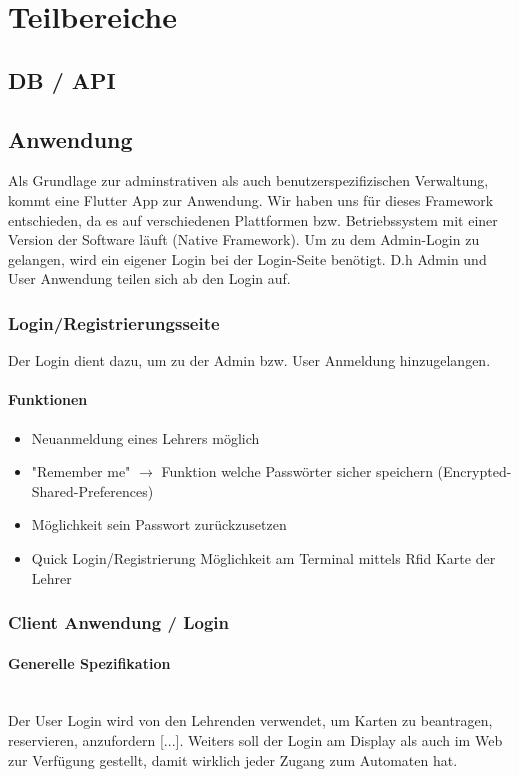 \documentclass[a4paper]{article}
\begin{document}
\newpage
\section{Teilbereiche}
\subsection{DB / API}


\newpage
\subsection{Anwendung}
Als Grundlage zur adminstrativen als auch benutzerspezifizischen Verwaltung, kommt eine Flutter App zur Anwendung. Wir haben uns für dieses Framework entschieden, da es auf verschiedenen Plattformen bzw. Betriebssystem mit einer Version der Software läuft (Native Framework). Um zu dem Admin-Login zu gelangen, wird ein eigener Login bei der Login-Seite benötigt. D.h Admin und User Anwendung teilen sich ab den Login auf.

\subsubsection{Login/Registrierungsseite}
Der Login dient dazu, um zu der Admin bzw. User Anmeldung hinzugelangen.
\paragraph{Funktionen}
\begin{itemize}
  \item Neuanmeldung eines Lehrers möglich
  \item "Remember me" $\rightarrow$ Funktion welche Passwörter sicher speichern (Encrypted-Shared-Preferences)
  \item Möglichkeit sein Passwort zurückzusetzen  
  \item Quick Login/Registrierung Möglichkeit am Terminal mittels Rfid Karte der Lehrer 
\end{itemize}

  
\subsubsection{Client Anwendung / Login}
\paragraph{Generelle Spezifikation}\mbox{}\\
Der User Login wird von den Lehrenden verwendet, um Karten zu beantragen, reservieren, anzufordern [...]. Weiters soll der Login am Display als auch im Web zur Verfügung gestellt, damit wirklich jeder Zugang zum Automaten hat. 
\end{document}
